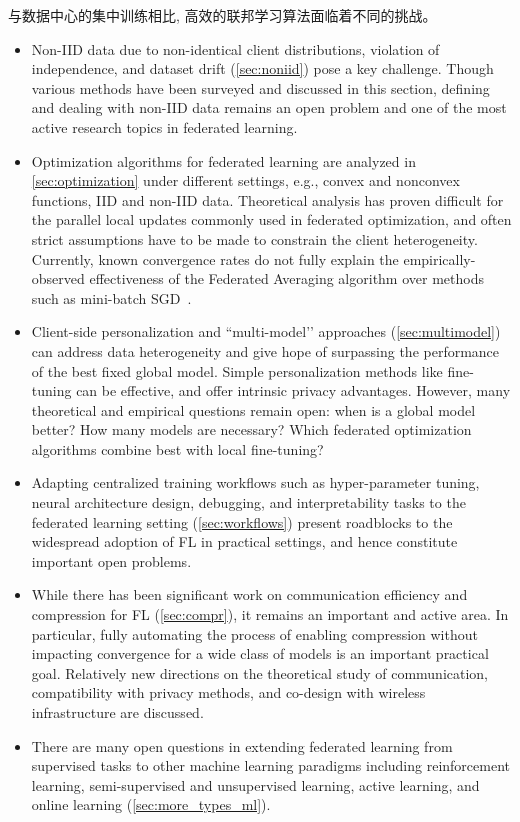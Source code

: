  
与数据中心的集中训练相比, 高效的联邦学习算法面临着不同的挑战。
\begin{itemize}

\item Non-IID data due to non-identical client distributions, violation of independence, and dataset drift (\cref{sec:noniid}) pose a key challenge. Though various methods have been surveyed and discussed in this section, defining and dealing with non-IID data remains an open problem and one of the most active research topics in federated learning.

\item Optimization algorithms for federated learning are analyzed in \cref{sec:optimization} under different settings, e.g., convex and nonconvex functions, IID and non-IID data. Theoretical analysis has proven difficult for the parallel local updates commonly used in federated optimization, and often strict assumptions have to be made to constrain the client heterogeneity. Currently, known convergence rates do not fully explain the empirically-observed effectiveness of the Federated Averaging algorithm over methods such as mini-batch SGD~\citep{woodworth2020local}.

\item Client-side personalization and ``multi-model’’ approaches (\cref{sec:multimodel}) can address data heterogeneity and give hope of surpassing the performance of the best fixed global model. Simple personalization methods like fine-tuning can be effective, and offer intrinsic privacy advantages. However, many theoretical and empirical questions remain open: when is a global model better? How many models are necessary? Which federated optimization algorithms combine best with local fine-tuning?

\item Adapting centralized training workflows such as hyper-parameter tuning, neural architecture design, debugging, and interpretability tasks to the federated learning setting (\cref{sec:workflows}) present roadblocks to the widespread adoption of FL in practical settings, and hence constitute important open problems. 

\item While there has been significant work on communication efficiency and compression for FL (\cref{sec:compr}), it remains an important and active area. In particular, fully automating the process of enabling compression without impacting convergence for a wide class of models is an important practical goal. Relatively new directions on the theoretical study of communication, compatibility with privacy methods, and co-design with wireless infrastructure are discussed.

\item There are many open questions in extending federated learning from supervised tasks to other machine learning paradigms including reinforcement learning, semi-supervised and unsupervised learning, active learning, and online learning (\cref{sec:more_types_ml}).

\end{itemize}

